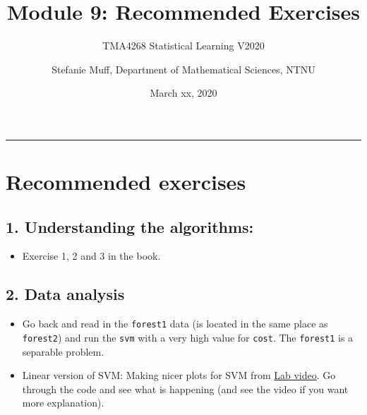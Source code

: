 \documentclass[]{article}
\title{Module 9: Recommended Exercises}
\subtitle{TMA4268 Statistical Learning V2020}
\author{Stefanie Muff, Department of Mathematical Sciences, NTNU}
\date{March xx, 2020}
\providecommand{\tightlist}{%
  \setlength{\itemsep}{0pt}\setlength{\parskip}{0pt}}
\begin{document}
\maketitle

{
\hypersetup{linkcolor=black}
\setcounter{tocdepth}{2}
\tableofcontents
}
\begin{center}\rule{0.5\linewidth}{\linethickness}\end{center}

\section{Recommended exercises}\label{recommended-exercises}

\subsection{1. Understanding the
algorithms:}\label{understanding-the-algorithms}

\begin{itemize}
\tightlist
\item
  Exercise 1, 2 and 3 in the book.
\end{itemize}

\subsection{2. Data analysis}\label{data-analysis}

\begin{itemize}
\item
  Go back and read in the \texttt{forest1} data (is located in the same
  place as \texttt{forest2}) and run the \texttt{svm} with a very high
  value for \texttt{cost}. The \texttt{forest1} is a separable problem.
\item
  Linear version of SVM: Making nicer plots for SVM from
  \href{https://www.youtube.com/watch?v=qhyyufR0930\&list=PL5-da3qGB5IDl6MkmovVdZwyYOhpCxo5o\&index=5}{Lab
  video}. Go through the code and see what is happening (and see the
  video if you want more explanation).
\end{itemize}
\end{document}
